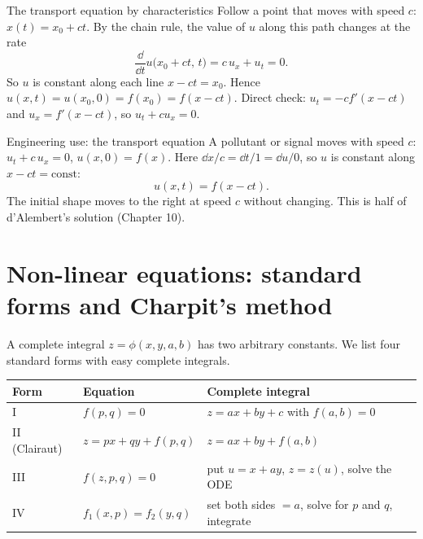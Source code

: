 \begin{derivbox}{The transport equation by characteristics}
Follow a point that moves with speed $c$: $x(t) = x_0 + ct$. By the chain rule, the value of $u$ along this path changes at the rate
\[ \frac{\dd}{\dd t}u\big(x_0 + ct,\,t\big) = c\,u_x + u_t = 0. \]
So $u$ is constant along each line $x - ct = x_0$. Hence $u(x,t) = u(x_0,0) = f(x_0) = f(x-ct)$. Direct check: $u_t = -cf'(x-ct)$ and $u_x = f'(x-ct)$, so $u_t + cu_x = 0$.
\end{derivbox}

\begin{examplebox}{Engineering use: the transport equation}
A pollutant or signal moves with speed $c$: $u_t + c\,u_x = 0$, $u(x,0)=f(x)$. Here $\dd x/c = \dd t/1 = \dd u/0$, so $u$ is constant along $x - ct = \text{const}$:
\[ u(x,t) = f(x-ct). \]
The initial shape moves to the right at speed $c$ without changing. This is half of d'Alembert's solution (Chapter 10).
\end{examplebox}

\section{Non-linear equations: standard forms and Charpit's method}

A complete integral $z = \phi(x,y,a,b)$ has two arbitrary constants. We list four standard forms with easy complete integrals.

\begin{center}
\renewcommand{\arraystretch}{1.45}
\begin{tabular}{@{}lll@{}}
\toprule
Form & Equation & Complete integral \\
\midrule
I & $f(p,q)=0$ & $z = ax + by + c$ with $f(a,b)=0$ \\
II (Clairaut) & $z = px + qy + f(p,q)$ & $z = ax + by + f(a,b)$ \\
III & $f(z,p,q)=0$ & put $u=x+ay$, $z=z(u)$, solve the ODE \\
IV & $f_1(x,p) = f_2(y,q)$ & set both sides $=a$, solve for $p$ and $q$, integrate \\
\bottomrule
\end{tabular}
\end{center}

